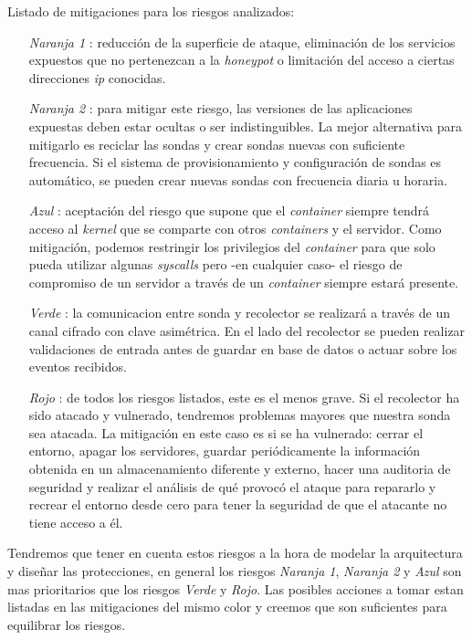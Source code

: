 Listado de mitigaciones para los riesgos analizados:
\begin{enumerate}
    \item[\emph{Naranja 1}]: reducción de la superficie de ataque, eliminación de los servicios expuestos que no pertenezcan a la \emph{honeypot} o limitación del acceso a ciertas direcciones \emph{ip} conocidas.
    \item[\emph{Naranja 2}]: para mitigar este riesgo, las versiones de las aplicaciones expuestas deben estar ocultas o ser indistinguibles. La mejor alternativa para mitigarlo es reciclar las sondas y crear sondas nuevas con suficiente frecuencia. Si el sistema de provisionamiento y configuración de sondas es automático, se pueden crear nuevas sondas con frecuencia diaria u horaria.
    \item[\emph{Azul}]: aceptación del riesgo que supone que el \emph{container} siempre tendrá acceso al \emph{kernel} que se comparte con otros \emph{containers} y el servidor. Como mitigación, podemos restringir los privilegios del \emph{container} para que solo pueda utilizar algunas \emph{syscalls} pero -en cualquier caso- el riesgo de compromiso de un servidor a través de un \emph{container} siempre estará presente. 
    \item[\emph{Verde}]: la comunicacion entre sonda y recolector se realizará a través de un canal cifrado con clave asimétrica. En el lado del recolector se pueden realizar validaciones de entrada antes de guardar en base de datos o actuar sobre los eventos recibidos.
    \item[\emph{Rojo}]: de todos los riesgos listados, este es el menos grave. Si el recolector ha sido atacado y vulnerado, tendremos problemas mayores que nuestra sonda sea atacada. La mitigación en este caso es si se ha vulnerado: cerrar el entorno, apagar los servidores, guardar periódicamente la información obtenida en un almacenamiento diferente y externo, hacer una auditoria de seguridad y realizar el análisis de qué provocó el ataque para repararlo y recrear el entorno desde cero para tener la seguridad de que el atacante no tiene acceso a él.
\end{enumerate}

Tendremos que tener en cuenta estos riesgos a la hora de modelar la arquitectura y diseñar las protecciones, en general los riesgos \emph{Naranja 1}, \emph{Naranja 2} y \emph{Azul} son mas prioritarios que los riesgos \emph{Verde} y \emph{Rojo}. Las posibles acciones a tomar estan listadas en las mitigaciones del mismo color y creemos que son suficientes para equilibrar los riesgos.

